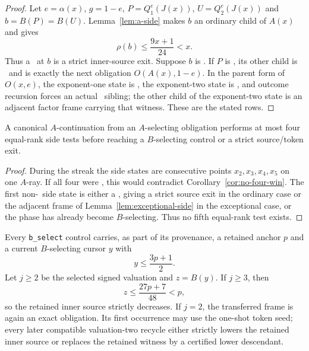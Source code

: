 \begin{proof}
Let $e=\alpha(x)$, $g=1-e$, $P=Q_1^e(J(x))$, $U=Q_2^e(J(x))$ and
$b=B(P)=B(U)$. Lemma~\ref{lem:a-side} makes $b$ an ordinary child of $A(x)$ and gives
\[
 \rho(b)\le\frac{9x+1}{24}<x.
\]
Thus a \DRAW\ at $b$ is a strict inner-source exit. Suppose $b$ is \WIN. If
$P$ is \DRAW, its other child is \DRAW\ and is exactly the next obligation
$O(A(x),1-e)$. In the parent form of $O(x,e)$, the exponent-one state is
\WIN, the exponent-two state is \DRAW, and outcome recursion forces an
actual \LOSS\ sibling; the other child of the exponent-two state is an
adjacent factor frame carrying that witness. These are the stated rows.
\end{proof}

\begin{lemma}\label{lem:a-streak}
A canonical $A$-continuation from an $A$-selecting obligation performs at
most four equal-rank side tests before reaching a $B$-selecting control or a
strict source/token exit.
\end{lemma}

\begin{proof}
During the streak the side states are consecutive points
$x_2,x_3,x_4,x_5$ on one $A$-ray. If all four were \WIN, this would contradict
Corollary~\ref{cor:no-four-win}. The first non-\WIN\ side state is either a
\DRAW, giving a strict source exit in the ordinary case or the adjacent frame of
Lemma~\ref{lem:exceptional-side} in the exceptional case, or the phase has already become
$B$-selecting. Thus no fifth equal-rank test exists.
\end{proof}

\begin{lemma}\label{lem:b-routing}
Every \texttt{b\_select} control carries, as part of its provenance, a retained
anchor $p$ and a current $B$-selecting cursor $y$ with
\[
  y\le\frac{3p+1}{2}.
\]
Let $j\ge2$ be the selected signed valuation and $z=B(y)$. If $j\ge3$, then
\[
  z\le\frac{27p+7}{48}<p,
\]
so the retained inner source strictly decreases. If $j=2$, the transferred
frame is again an exact obligation. Its first occurrence may use the one-shot
token seed; every later compatible valuation-two recycle either strictly
lowers the retained inner source or replaces the retained witness by a
certified lower descendant.
\end{lemma}

